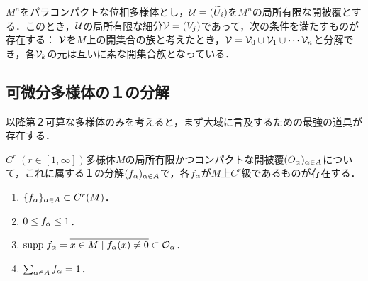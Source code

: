 \documentclass[uplatex,dvipdfmx]{jsreport}
\begin{document}
\begin{theorem}[パラコンパクト多様体の開被覆]\label{thm-open-cover-of-paracompact-locally-Euclidean-space}
    $M^n$をパラコンパクトな位相多様体とし，$\mathcal{U}=(\widetilde{U}_i)$を$M^n$の局所有限な開被覆とする．このとき，$\mathcal{U}$の局所有限な細分$\mathcal{V}=(V_j)$であって，次の条件を満たすものが存在する：
    $\mathcal{V}$を$M$上の開集合の族と考えたとき，$\mathcal{V}=\mathcal{V}_0\cup\mathcal{V}_1\cup\cdots\mathcal{V}_n$と分解でき，各$\mathcal{V}_k$の元は互いに素な開集合族となっている．
\end{theorem}

\subsection{可微分多様体の１の分解}

\begin{tcolorbox}[colframe=ForestGreen, colback=ForestGreen!10!white,breakable,colbacktitle=ForestGreen!40!white,coltitle=black,fonttitle=\bfseries\sffamily,
title=]
    以降第２可算な多様体のみを考えると，まず大域に言及するための最強の道具が存在する．
\end{tcolorbox}

\begin{theorem}
    $C^r\;(r\in[1,\infty])$多様体$M$の局所有限かつコンパクトな開被覆$(O_\alpha)_{\alpha\in A}$について，これに属する１の分解$(f_\alpha)_{\alpha\in A}$で，各$f_\alpha$が$M$上$C^r$級であるものが存在する．
    \begin{enumerate}
        \item $\{f_\alpha\}_{\alpha\in A}\subset C^r(M)$．
        \item $0\le f_\alpha\le 1$．
        \item $\mathrm{supp}\; f_\alpha=\overline{x\in M\mid f_\alpha(x)\ne 0}\subset\mathcal{O}_\alpha$．
        \item $\sum_{\alpha\in A}f_\alpha=1$．
    \end{enumerate}
\end{theorem}
\end{document}
